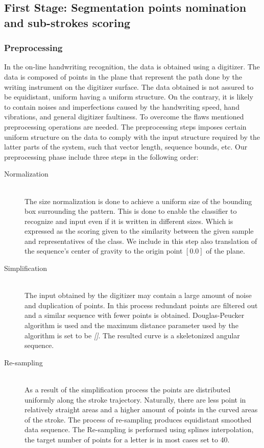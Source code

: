 \documentclass[journal,compsoc]{IEEEtran}
\begin{document}
\subsection{First Stage: Segmentation points nomination and sub-strokes scoring}
\subsubsection{Preprocessing}
In the on-line handwriting recognition, the data is obtained using a  digitizer. The data is composed of points in the plane that represent the path done by the writing instrument on the digitizer surface. The data obtained is not assured to be equidistant, uniform having a uniform structure. On the contrary, it is likely to contain noises and imperfections caused by the handwriting speed, hand vibrations, and general digitizer faultiness.   
To overcome the flaws mentioned preprocessing operations are needed. The preprocessing steps imposes certain uniform structure on the data to comply with the input structure required by the latter parts of the system, such that vector length, sequence bounds, etc.
Our preprocessing phase include three steps in the following order:
\begin{description}
  \item[Normalization] \hfill \\
  The size normalization is done to achieve a uniform size of the bounding box surrounding the pattern. This is done to enable the classifier to recognize and input even if it is written in different sizes. Which is expressed as the scoring given to the similarity between the given sample and representatives of the class. We include in this step also translation of the sequence's center of gravity to the origin point $[0.0]$ of the plane.
  \item[Simplification] \hfill \\
  The input obtained by the digitizer may contain a large amount of noise and duplication of points. In this process redundant points are filtered out and a similar sequence with fewer points is obtained. Douglas-Peucker algorithm is used and the maximum distance parameter used by the algorithm is set to be \emph{[]}. The resulted curve is a skeletonized angular sequence. 
  \item[Re-sampling] \hfill \\
  As a result of the simplification process the points are distributed uniformly along the stroke trajectory. Naturally, there are less point in relatively straight areas and a higher amount of points in the curved areas of the stroke. The process of re-sampling produces equidistant smoothed data sequence. The Re-sampling is performed using splines interpolation, the target number of points for a letter is in most cases set to 40. 
\end{description}
\end{document}
